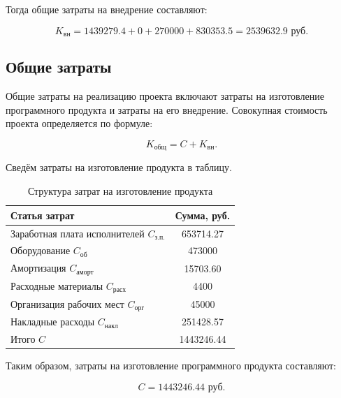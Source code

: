 Тогда общие затраты на внедрение составляют:

\begin{equation}
K_{\text{вн}} =
1439279.4 + 0 + 270000 + 830353.5 =
2539632.9 \text{ руб.}
\end{equation}

\subsection{Общие затраты}

Общие затраты на реализацию проекта включают затраты на изготовление
программного продукта и затраты на его внедрение. Совокупная стоимость
проекта определяется по формуле:

\begin{equation}
K_{\text{общ}} = C + K_{\text{вн}}.
\end{equation}

Сведём затраты на изготовление продукта в таблицу.

\begin{table}[h]
\centering
\caption{Структура затрат на изготовление продукта}
\label{tab:dev_costs}
\begin{tabular}{|p{10cm}|c|}
\hline
Статья затрат & Сумма, руб. \\ \hline

Заработная плата исполнителей $C_{\text{з.п.}}$ &
653714.27 \\ \hline

Оборудование $C_{\text{об}}$ &
473000 \\ \hline

Амортизация $C_{\text{аморт}}$ &
15703.60 \\ \hline

Расходные материалы $C_{\text{расх}}$ &
4400 \\ \hline

Организация рабочих мест $C_{\text{орг}}$ &
45000 \\ \hline

Накладные расходы $C_{\text{накл}}$ &
251428.57 \\ \hline

\hline
Итого $C$ & 1443246.44 \\ \hline

\end{tabular}
\end{table}

Таким образом, затраты на изготовление программного продукта составляют:

\begin{equation}
C = 1443246.44 \text{ руб.}
\end{equation}

